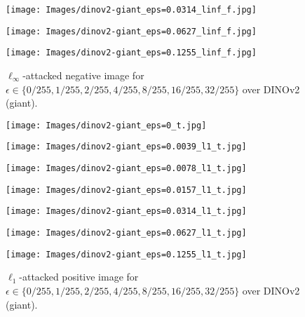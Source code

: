 \documentclass[12pt]{article}
\begin{document}
\begin{figure}[ht]
\begin{minipage}{0.125\textwidth}
  \end{minipage}
  \hfill
  \begin{minipage}{0.125\textwidth}
    \texttt{[image: Images/dinov2-giant\_eps=0.0314\_linf\_f.jpg]}
  \end{minipage}
  \hfill
  \begin{minipage}{0.125\textwidth}
    \texttt{[image: Images/dinov2-giant\_eps=0.0627\_linf\_f.jpg]}
  \end{minipage}
  \hfill
  \begin{minipage}{0.125\textwidth}
    \texttt{[image: Images/dinov2-giant\_eps=0.1255\_linf\_f.jpg]}
  \end{minipage}
  \label{fig:dino_linf_negative_examples}
  \caption{$\ell_\infty$-attacked negative image for $\epsilon \in \{0/255, 1/255, 2/255, 4/255, 8/255, 16/255, 32/255\}$ over DINOv2 (giant).}
  \vspace{10pt}
  \begin{minipage}{0.125\textwidth}
    \texttt{[image: Images/dinov2-giant\_eps=0\_t.jpg]}
  \end{minipage}
  \hfill
  \begin{minipage}{0.125\textwidth}
    \texttt{[image: Images/dinov2-giant\_eps=0.0039\_l1\_t.jpg]}
  \end{minipage}
  \hfill
  \begin{minipage}{0.125\textwidth}
    \texttt{[image: Images/dinov2-giant\_eps=0.0078\_l1\_t.jpg]}
  \end{minipage}
  \hfill
  \begin{minipage}{0.125\textwidth}
    \texttt{[image: Images/dinov2-giant\_eps=0.0157\_l1\_t.jpg]}
  \end{minipage}
  \hfill
  \begin{minipage}{0.125\textwidth}
    \texttt{[image: Images/dinov2-giant\_eps=0.0314\_l1\_t.jpg]}
  \end{minipage}
  \hfill
  \begin{minipage}{0.125\textwidth}
    \texttt{[image: Images/dinov2-giant\_eps=0.0627\_l1\_t.jpg]}
  \end{minipage}
  \hfill
  \begin{minipage}{0.125\textwidth}
    \texttt{[image: Images/dinov2-giant\_eps=0.1255\_l1\_t.jpg]}
  \end{minipage}
  \label{fig:dino_l1_positive_examples}
  \caption{$\ell_1$-attacked positive image for $\epsilon \in \{0/255, 1/255, 2/255, 4/255, 8/255, 16/255, 32/255\}$ over DINOv2 (giant).}

\end{figure}
\end{document}
